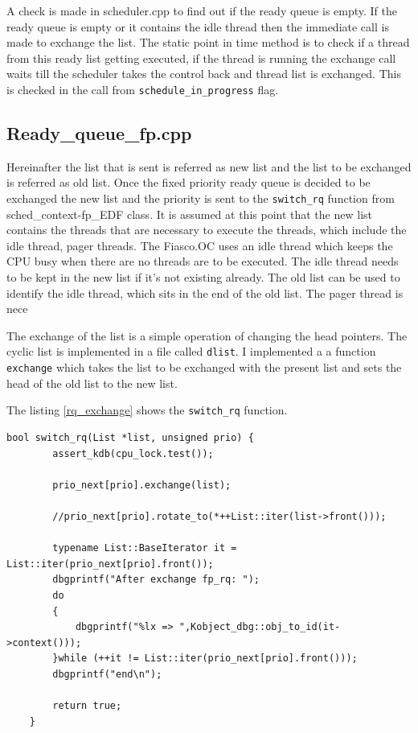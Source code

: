 A check is made in scheduler.cpp to find out if the ready queue is empty. If the ready queue is empty or it contains the idle thread then the immediate call is made to exchange the list. The static point in time method is to check if a thread from this ready list getting executed, if the thread is running
the exchange call waits till the scheduler takes the control back and thread list is exchanged. This is checked in the call from \texttt{schedule\_in\_progress} flag. 


\subsection{Ready\_queue\_fp.cpp}
Hereinafter the list that is sent is referred as new list and the list to be exchanged is referred as old list. Once the fixed priority ready queue is decided to be exchanged the new list and the priority is sent to the \texttt{switch\_rq} function from sched\_context-fp\_EDF class. It is assumed at this point that the new list contains the threads that are necessary to execute the threads, which include the idle thread, pager threads. The Fiasco.OC uses an idle thread which keeps the CPU busy when there are no threads are to be executed. The idle thread needs to be kept in the new list if it's not existing already. The old list can be used to identify the idle thread, which sits in the end of the old list. The pager thread is nece

The exchange of the list is a simple operation of changing the head pointers. The cyclic list is implemented in a file called \texttt{dlist}. I implemented a a function \texttt{exchange} which takes the list to be exchanged with the present list and sets the head of the old list to the new list. 

The listing \ref{rq_exchange} shows the \texttt{switch\_rq} function.

 \begin{lstlisting}[caption={Exchanging the ready queue},label=rq_exchange, style=customcpp]
 bool switch_rq(List *list, unsigned prio) {
   		assert_kdb(cpu_lock.test());
 
   		prio_next[prio].exchange(list);
 
   		//prio_next[prio].rotate_to(*++List::iter(list->front()));
 
   		typename List::BaseIterator it = List::iter(prio_next[prio].front());
   		dbgprintf("After exchange fp_rq: ");
   		do
   		{
   			dbgprintf("%lx => ",Kobject_dbg::obj_to_id(it->context()));
   		}while (++it != List::iter(prio_next[prio].front()));
   		dbgprintf("end\n");
 
   		return true;
   	}
 
\end{lstlisting} 

